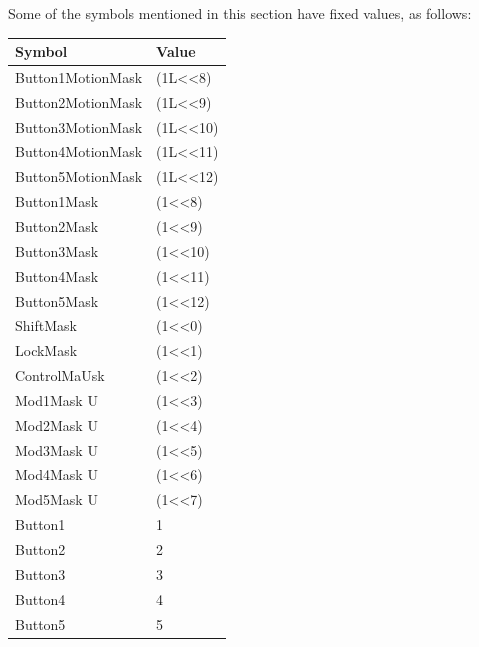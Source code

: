 \documentclass{report}
\begin{document}
\begin{itemize}
            \bigbreak \noindent 
            Some of the symbols mentioned in this section have fixed values, as follows:
            \begin{center}
                \begin{tabularx}{\textwidth}{@{}Xl@{}}
                    \toprule
                    \textbf{Symbol}& \textbf{Value} \\
                    \midrule
                    Button1MotionMask &(1L<<8)\\[2ex]
                    Button2MotionMask &(1L<<9)\\[2ex]
                    Button3MotionMask &(1L<<10)\\[2ex]
                    Button4MotionMask &(1L<<11)\\[2ex]
                    Button5MotionMask &(1L<<12) \\[2ex]
                    Button1Mask &(1<<8)\\[2ex]
                    Button2Mask &(1<<9)\\[2ex]
                    Button3Mask &(1<<10)\\[2ex]
                    Button4Mask &(1<<11)\\[2ex]
                    Button5Mask &(1<<12)\\[2ex]
                    ShiftMask &(1<<0)\\[2ex]
                    LockMask &(1<<1)\\[2ex]
                    ControlMaUsk &(1<<2)\\[2ex]
                    Mod1Mask U&(1<<3)\\[2ex]
                    Mod2Mask U&(1<<4)\\[2ex]
                    Mod3Mask U&(1<<5)\\[2ex]
                    Mod4Mask U&(1<<6)\\[2ex]
                    Mod5Mask U&(1<<7)\\[2ex]
                    Button1 &1\\[2ex]
                    Button2 &2\\[2ex]
                    Button3 &3\\[2ex]
                    Button4 &4\\[2ex]
                    Button5 &5 \\
                    \bottomrule
                \end{tabularx}
            \end{center}
            \begin{itemize}

\end{itemize}
\end{itemize}
\end{document}
